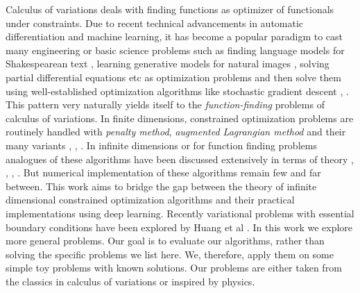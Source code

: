Calculus of variations deals with finding functions as optimizer of functionals under constraints. Due to recent technical advancements in automatic differentiation and machine learning, it has become a popular paradigm to cast many engineering or basic science problems such as finding language models for Shakespearean text \cite{jhamtani2017shakespearizing}, learning generative models for natural images \cite{huang2018introduction}, solving partial differential equations \cite{blechschmidt2021three} etc as optimization problems and then solve them using well-established optimization algorithms like stochastic gradient descent \cite{ruder2016overview}, \cite{bottou2007tradeoffs}. This pattern very naturally yields itself to the \textit{function-finding} problems of calculus of variations. In finite dimensions, constrained optimization problems are routinely handled with \textit{penalty method}, \textit{augmented Lagrangian method} and their many variants \cite{jorge2006numerical}, \cite{bonnans2006numerical}, \cite{bertsekas1995athena}. In infinite dimensions or for function finding problems analogues of these algorithms have been discussed extensively in terms of theory \cite{ito2008lagrange}, \cite{kanzow2018augmented}, \cite{dussault2007penalty}, \cite{fiacco1969generalized}. But numerical implementation of these algorithms remain few and far between. This work aims to bridge the gap between the theory of infinite dimensional constrained optimization algorithms and their practical implementations using deep learning. Recently variational problems with essential boundary conditions have been explored by Huang et al \cite{huang2021augmented}. In this work we explore more general problems. Our goal is to evaluate our algorithms, rather than solving the specific problems we list here. We, therefore, apply them on some simple toy problems with known solutions. Our problems are either taken from the classics in calculus of variations or inspired by physics. 



